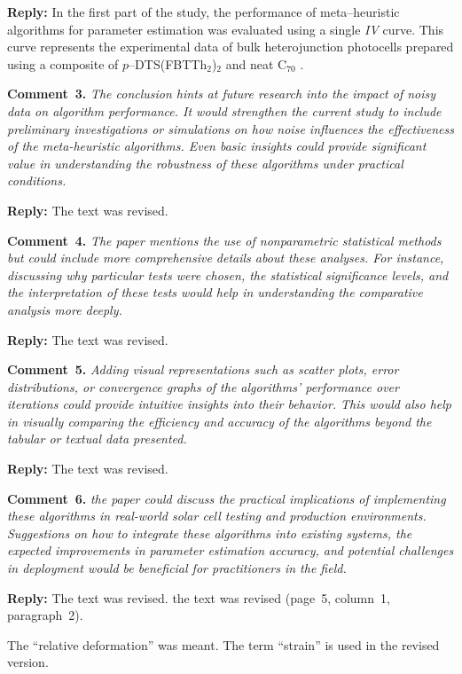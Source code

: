 \documentclass[a4paper,fleqn]{cas-sc}
\begin{document}
\noindent
\textcolor[rgb]{0.51,0.00,0.00}{\textbf{Reply:}}
In the first part of the study, the performance of meta--heuristic algorithms for parameter estimation was evaluated using a single \emph{IV} curve.
This curve represents the experimental data of bulk heterojunction photocells prepared
using a composite of $p$--DTS(FBTTh$_2$)$_2$ and neat C$_{70}$ \cite{Tada2015Organic}.


\vspace{1cm}
\noindent
\textcolor[rgb]{0.00,0.50,1.00}{\textbf{Comment~3.}}
\emph{The conclusion hints at future research into the impact of noisy data on algorithm performance.
It would strengthen the current study to include preliminary investigations or simulations on how noise influences the effectiveness of the meta-heuristic algorithms.
Even basic insights could provide significant value in understanding the robustness of these algorithms under practical conditions.}

\noindent
\textcolor[rgb]{0.51,0.00,0.00}{\textbf{Reply:}}
The text was revised.


\vspace{1cm}
\noindent
\textcolor[rgb]{0.00,0.50,1.00}{\textbf{Comment~4.}}
\emph{The paper mentions the use of nonparametric statistical methods but could include more comprehensive details about these analyses.
For instance, discussing why particular tests were chosen, the statistical significance levels,
 and the interpretation of these tests would help in understanding the comparative analysis more deeply.}

\noindent
\textcolor[rgb]{0.51,0.00,0.00}{\textbf{Reply:}}
The text was revised.


\vspace{1cm}
\noindent
\textcolor[rgb]{0.00,0.50,1.00}{\textbf{Comment~5.}}
\emph{ Adding visual representations such as scatter plots, error distributions,
or convergence graphs of the algorithms' performance over iterations could provide intuitive insights into their behavior.
This would also help in visually comparing the efficiency and accuracy of the algorithms beyond the tabular or textual data presented.}

\noindent
\textcolor[rgb]{0.51,0.00,0.00}{\textbf{Reply:}}
The text was revised.


\vspace{1cm}
\noindent
\textcolor[rgb]{0.00,0.50,1.00}{\textbf{Comment~6.}}
\emph{ the paper could discuss the practical implications of implementing these algorithms
in real-world solar cell testing and production environments.
Suggestions on how to integrate these algorithms into existing systems, the expected improvements
in parameter estimation accuracy, and potential challenges in deployment would be beneficial for practitioners in the field.}

\noindent
\textcolor[rgb]{0.51,0.00,0.00}{\textbf{Reply:}}
The text was revised.
the text was revised (page~5, column~1, paragraph~2).

The ``relative deformation'' was meant.
The term ``strain'' is used in the revised version.



\end{document}
